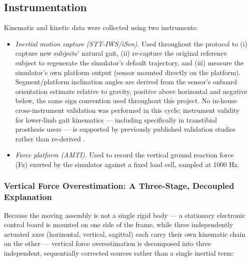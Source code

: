 \documentclass[prosthesis,article,submit,moreauthors]{Definitions/mdpi}
\begin{document}
\subsection{Instrumentation}

Kinematic and kinetic data were collected using two instruments:

\begin{itemize}
\item \textit{Inertial motion capture (STT-IWS/iSen).} Used throughout
the protocol to (i) capture new subjects' natural gait, (ii) re-capture
the original reference subject to regenerate the simulator's default
trajectory, and (iii) measure the simulator's own platform output
(sensor mounted directly on the platform). Segment/platform inclination
angles are derived from the sensor's onboard orientation estimate
relative to gravity, positive above horizontal and negative below, the
same sign convention used throughout this project. No in-house
cross-instrument validation was performed in this cycle; instrument
validity for lower-limb gait kinematics --- including specifically in
transtibial prosthesis users --- is supported by previously published
validation studies rather than re-derived \cite{PENDIENTE_iSen_transtibial}.
\item \textit{Force platform (AMTI).} Used to record the vertical
ground reaction force (Fz) exerted by the simulator against a fixed
load cell, sampled at 1000 Hz.
\end{itemize}

\subsubsection{Vertical Force Overestimation: A Three-Stage, Decoupled Explanation}

Because the moving assembly is not a single rigid body --- a stationary
electronic control board is mounted on one side of the frame, while
three independently actuated axes (horizontal, vertical, sagittal) each
carry their own kinematic chain on the other --- vertical force
overestimation is decomposed into three independent, sequentially
corrected sources rather than a single inertial term:
\end{document}
